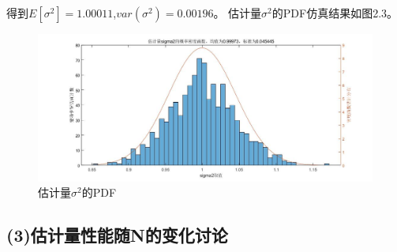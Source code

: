 \documentclass[fontset=windows]{article}
\numberwithin{figure}{section}
\begin{document}
得到\(E[\sigma^2]=1.00011\),\(var(\sigma^2)=0.00196\)。
估计量\(\sigma^2\)的PDF仿真结果如图2.3。
\begin{figure}[H]
	\centering
	\includegraphics[scale=0.4]{fig2.3.jpg}
	\caption{估计量\(\sigma^2\)的PDF}
	\label{2.3}
\end{figure}

\subsection*{(3)估计量性能随N的变化讨论}
\end{document}
